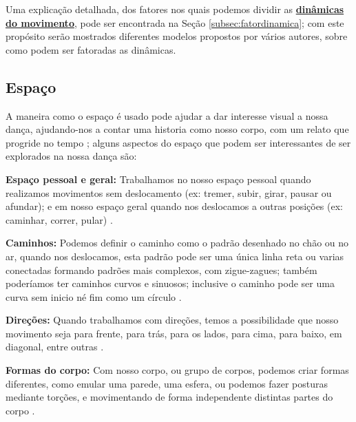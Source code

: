 Uma explicação detalhada, dos fatores nos quais podemos dividir as 
\hyperref[subsec:fatordinamica]{\textbf{dinâmicas do movimento}},
pode ser encontrada na Seção \ref{subsec:fatordinamica};
com este propósito serão mostrados diferentes modelos propostos por vários autores,
sobre como podem ser fatoradas as dinâmicas.



\subsection{Espaço} 
A maneira como o espaço é usado pode ajudar a dar interesse visual a nossa dança,
ajudando-nos a contar uma historia como nosso corpo, com um relato que progride no tempo 
\cite[pp. 6]{carline2011lesson}
\cite[pp. 31]{paine2014complete}
\cite[pp. 131, 136]{mccutchen2006teaching}; 
alguns aspectos do espaço que podem ser interessantes de ser explorados na nossa dança são:

\textbf{Espaço pessoal e geral:}  Trabalhamos no nosso espaço pessoal 
quando realizamos movimentos sem deslocamento 
(ex: tremer, subir, girar, pausar ou afundar);
e em nosso espaço geral quando nos deslocamos a outras posições
(ex: caminhar, correr, pular) \cite[pp. 7]{carline2011lesson}
\cite[pp. 32]{paine2014complete}.

\textbf{Caminhos:} Podemos definir o caminho como o padrão desenhado no chão ou no ar, 
quando nos deslocamos,
esta padrão pode ser uma única linha reta ou 
varias conectadas formando padrões mais complexos, 
 com zigue-zagues; também poderíamos ter caminhos curvos e sinuosos; 
inclusive o caminho pode ser uma curva sem inicio né fim como um círculo 
\cite[pp. 7]{carline2011lesson}
\cite[pp. 32]{paine2014complete}.



\textbf{Direções:} Quando trabalhamos com direções, 
temos a possibilidade que nosso movimento seja 
para frente, para trás, para os lados, para cima, para baixo, em diagonal,
entre outras 
\cite[pp. 7]{carline2011lesson}
\cite[pp. 32]{paine2014complete}
\cite[pp. 97-98]{schrader2005sense}. 


\textbf{Formas do corpo:} Com nosso corpo, ou grupo de corpos, podemos criar formas diferentes,
como emular uma parede, uma esfera, 
ou podemos fazer posturas mediante torções, 
e movimentando de forma independente distintas partes do corpo 
\cite[pp. 8]{carline2011lesson}
\cite[pp. 32]{paine2014complete}
\cite[pp. 97]{schrader2005sense}.

